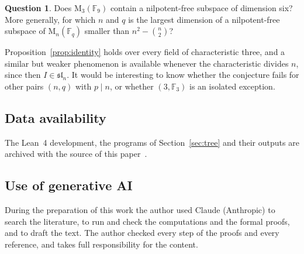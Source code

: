 \documentclass[11pt]{amsart}
\theoremstyle{definition}
\newtheorem{question}[theorem]{Question}
\theoremstyle{remark}
\numberwithin{equation}{section}
\newcommand{\F}{\mathbb{F}}
\newcommand{\M}{\mathrm{M}}
\newcommand{\sll}{\mathfrak{sl}}
\begin{document}
\begin{question}
Does $\M_3(\F_9)$ contain a nilpotent-free subspace of dimension six? More generally, for which $n$ and $q$ is the largest dimension of a nilpotent-free subspace of $\M_n(\F_q)$ smaller than $n^2-\binom n2$?
\end{question}

Proposition~\ref{prop:identity} holds over every field of characteristic three, and a similar but weaker phenomenon is available whenever the characteristic divides $n$, since then $I\in\sll_n$. It would be interesting to know whether the conjecture fails for other pairs $(n,q)$ with $p\mid n$, or whether $(3,\F_3)$ is an isolated exception.

\subsection*{Data availability}
The Lean~4 development, the programs of Section~\ref{sec:tree} and their outputs are archived with the source of this paper~\cite{Ar}.

\subsection*{Use of generative AI}
During the preparation of this work the author used Claude (Anthropic) to search the literature, to run and check the computations and the formal proofs, and to draft the text. The author checked every step of the proofs and every reference, and takes full responsibility for the content.
\end{document}
